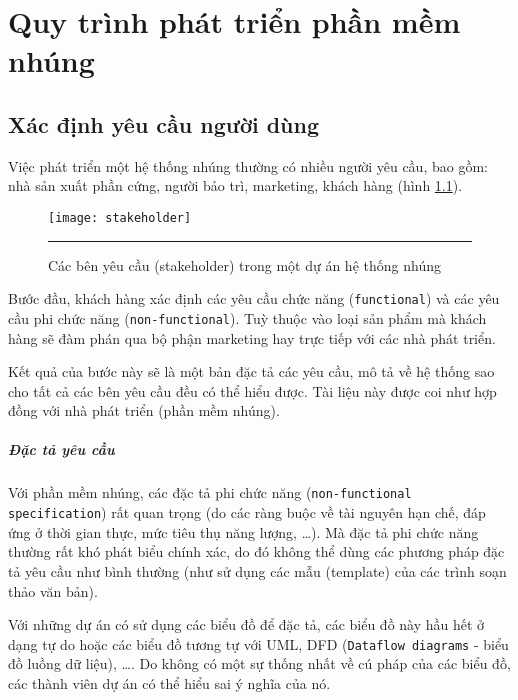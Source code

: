\chapter{Quy trình phát triển phần mềm nhúng}
    

    \section{Xác định yêu cầu người dùng}
        Việc phát triển một hệ thống nhúng thường có nhiều người yêu cầu, bao
        gồm: nhà sản xuất phần cứng, người bảo trì, marketing, khách hàng (hình
        \ref{fig:stakeholder})\cite{EmbSysState}.

        \begin{figure}[H]
            \centering
            \texttt{[image: stakeholder]}
            \rule{35em}{0.5pt}
            \caption{Các bên yêu cầu (stakeholder) trong một dự án hệ thống nhúng}
            \label{fig:stakeholder}
        \end{figure}

        Bước đầu, khách hàng xác định các yêu cầu chức năng
        (\texttt{functional}) và các yêu cầu phi chức năng
        (\texttt{non-functional}). Tuỳ thuộc vào loại sản phẩm mà khách hàng sẽ
        đàm phán qua bộ phận marketing hay trực tiếp với các nhà phát triển.

        Kết quả của bước này sẽ là một bản đặc tả các yêu cầu, mô tả về hệ
        thống sao cho tất cả các bên yêu cầu đều có thể hiểu được. Tài liệu này
        được coi như hợp đồng với nhà phát triển (phần mềm nhúng).

        \paragraph{Đặc tả yêu cầu}

        Với phần mềm nhúng, các đặc tả phi chức năng (\texttt{non-functional
        specification}) rất quan trọng (do các ràng buộc về tài nguyên hạn chế,
        đáp ứng ở thời gian thực, mức tiêu thụ năng lượng, \ldots). Mà đặc tả
        phi chức năng thường rất khó phát biểu chính xác, do đó không
        thể dùng các phương pháp đặc tả yêu cầu như bình thường (như sử dụng
        các mẫu (template) của các trình soạn thảo văn bản).

        Với những dự án có sử dụng các biểu đồ để đặc tả, các biểu đồ này hầu
        hết ở dạng tự do hoặc các biểu đồ tương tự với UML, DFD
        (\texttt{Dataflow diagrams} - biểu đồ luồng dữ liệu), \ldots. Do không
        có một sự thống nhất về cú pháp của các biểu đồ, các thành viên dự án
        có thể hiểu sai ý nghĩa của nó.

